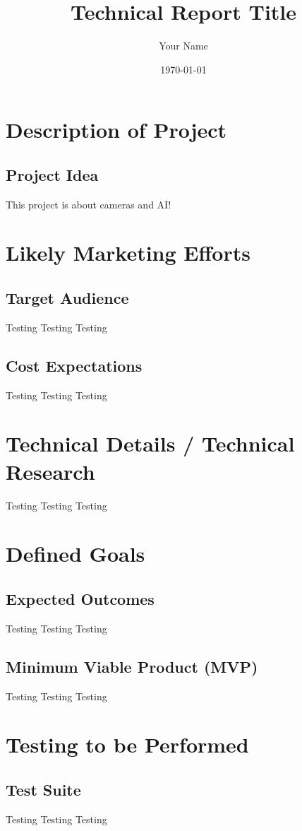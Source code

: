 \documentclass{report}
\title{Technical Report Title}
\author{Your Name}
\date{\today}
\begin{document}
\maketitle

\tableofcontents
\newpage

\chapter{Description of Project}
\section{Project Idea}
This project is about cameras and AI!

\chapter{Likely Marketing Efforts}
\section{Target Audience}
Testing Testing Testing
\section{Cost Expectations}
Testing Testing Testing

\chapter{Technical Details / Technical Research}
Testing Testing Testing

\chapter{Defined Goals}
\section{Expected Outcomes}
Testing Testing Testing
\section{Minimum Viable Product (MVP)}
Testing Testing Testing

\chapter{Testing to be Performed}
\section{Test Suite}
Testing Testing Testing
\end{document}
